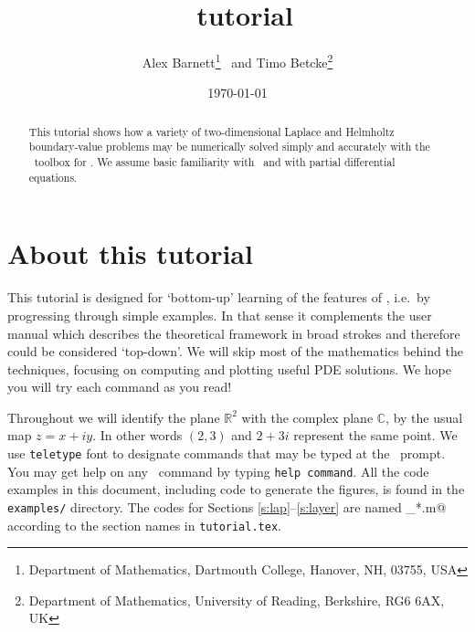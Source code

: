 \documentclass[11pt]{article}
\begin{document}
\title{\mpspack\ tutorial}
\author{Alex Barnett\footnote{Department of Mathematics, Dartmouth College,
Hanover, NH, 03755, USA}
\ and
Timo Betcke\footnote{Department of Mathematics,
University of Reading, Berkshire, RG6 6AX, UK}}
\date{\today}   %

\maketitle
\begin{abstract}
This tutorial shows how a variety of two-dimensional Laplace and Helmholtz
boundary-value problems
may be numerically solved simply and accurately with the \mpspack\ toolbox
for \matlab. We assume basic familiarity with \matlab\
and with partial differential equations.
\end{abstract}


\section{About this tutorial}

This tutorial is designed for `bottom-up' learning of the features
of \mpspack, i.e.\ by progressing through simple examples.
In that sense it complements the user manual which describes
the theoretical framework in broad strokes and therefore could
be considered `top-down'.
We will skip most of the mathematics behind the techniques,
focusing on computing and plotting useful PDE solutions.
We hope you will try each command as you read!

Throughout we will identify the plane $\mathbb{R}^2$ with the complex
plane $\mathbb{C}$, by the usual map $z=x+iy$. In other words
$(2,3)$ and $2+3i$ represent the same point.
We use {\tt teletype} font to designate commands that may be typed
at the \matlab\ prompt.
You may get help on any \mpspack\ command by typing {\tt help command}.
All the code examples in this document, including code to generate the
figures, is found in the {\tt examples/} directory.
The codes for Sections \ref{s:lap}--\ref{s:layer} are named
\verb@tut_*.m@ according to the section names in {\tt tutorial.tex}.









 

\end{document}
